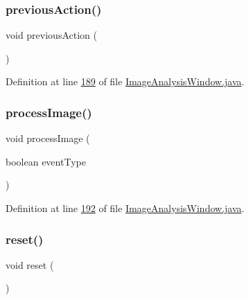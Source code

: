 \subsubsection{\texorpdfstring{previous\+Action()}{previousAction()}}
{\footnotesize\ttfamily void previous\+Action (\begin{DoxyParamCaption}{ }\end{DoxyParamCaption})\hspace{0.3cm}{\ttfamily [protected]}}



Definition at line \hyperlink{_image_analysis_window_8java_source_l00189}{189} of file \hyperlink{_image_analysis_window_8java_source}{Image\+Analysis\+Window.\+java}.

\hypertarget{classgui_1_1_image_analysis_window_a92de44ef00adbefce701ecb95b7d926b}{}\label{classgui_1_1_image_analysis_window_a92de44ef00adbefce701ecb95b7d926b} 
\subsubsection{\texorpdfstring{process\+Image()}{processImage()}}
{\footnotesize\ttfamily void process\+Image (\begin{DoxyParamCaption}\item[{boolean}]{event\+Type }\end{DoxyParamCaption})\hspace{0.3cm}{\ttfamily [protected]}}



Definition at line \hyperlink{_image_analysis_window_8java_source_l00192}{192} of file \hyperlink{_image_analysis_window_8java_source}{Image\+Analysis\+Window.\+java}.

\hypertarget{classgui_1_1_image_analysis_window_ad20897c5c8bd47f5d4005989bead0e55}{}\label{classgui_1_1_image_analysis_window_ad20897c5c8bd47f5d4005989bead0e55} 
\subsubsection{\texorpdfstring{reset()}{reset()}}
{\footnotesize\ttfamily void reset (\begin{DoxyParamCaption}{ }\end{DoxyParamCaption})}



